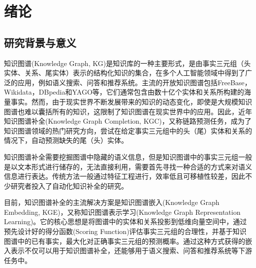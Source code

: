 \chapter{绪论}

\section{研究背景与意义}
知识图谱(Knowledge Graph, KG)是知识库的一种主要形式，是由事实三元组（头实体、关系、尾实体）表示的结构化知识的集合，在多个人工智能领域中得到了广泛的应用，例如语义搜索、问答和推荐系统。主流的开放知识图谱包括FreeBase，Wikidata，DBpedia和YAGO等，它们通常包含由数十亿个实体和关系所构建的海量事实。然而，由于现实世界不断发展带来的知识的动态变化，即使是大规模知识图谱也难以囊括所有的知识，这限制了知识图谱在现实世界中的应用。因此，近年知识图谱补全(Knowledge Graph Completion, KGC)，又称链路预测任务，成为了知识图谱领域的热门研究方向，尝试在给定事实三元组中的头（尾）实体和关系的情况下，自动预测缺失的尾（头）实体。



知识图谱补全需要挖掘图谱中隐藏的语义信息，但是知识图谱中的事实三元组一般是以文本形式进行储存的，无法直接利用，需要首先寻找一种合适的方式来对语义信息进行表达。传统方法一般通过特征工程进行，效率低且可移植性较差，因此不少研究者投入了自动化知识补全的研究。

目前，知识图谱补全的主流解决方案是知识图谱嵌入(Knowledge Graph Embedding, KGE)，又称知识图谱表示学习(Knowledge Graph Representation Learning)。它的核心思想是将图谱中的实体和关系投影到低维向量空间中，通过预先设计好的得分函数(Scoring Function)评估事实三元组的合理性，并基于知识图谱中的已有事实，最大化对正确事实三元组的预测概率。通过这种方式获得的嵌入表示不仅可以用于知识图谱补全，还能够用于语义搜索、问答和推荐系统等下游任务中。

